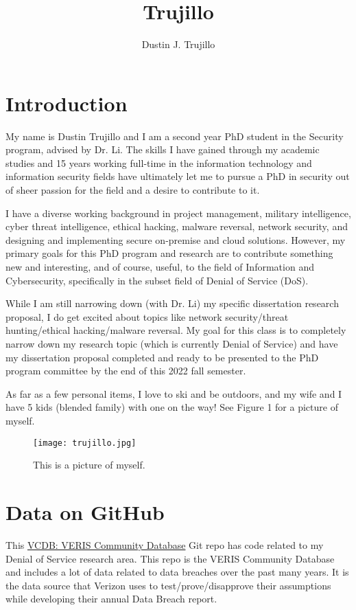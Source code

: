 \documentclass[a4paper]{article}
\date{\displaydate{date}}
\title{Trujillo}
\author{Dustin J. Trujillo}
\begin{document}
\maketitle


\section{Introduction}

My name is Dustin Trujillo and I am a second year PhD student in the Security program, advised by Dr. Li. The skills I have gained through my academic studies and 15 years working full-time in the information technology and information security fields have ultimately let me to pursue a PhD in security out of sheer passion for the field and a desire to contribute to it.

I have a diverse working background in project management, military intelligence, cyber threat intelligence, ethical hacking, malware reversal, network security, and designing and implementing secure on-premise and cloud solutions. However, my primary goals for this PhD program and research are to contribute something new and interesting, and of course, useful, to the field of Information and Cybersecurity, specifically in the subset field of Denial of Service (DoS).

While I am still narrowing down (with Dr. Li) my specific dissertation research proposal, I do get excited about topics like network security/threat hunting/ethical hacking/malware reversal. My goal for this class is to completely narrow down my research topic (which is currently Denial of Service) and have my dissertation proposal completed and ready to be presented to the PhD program committee by the end of this 2022 fall semester.

As far as a few personal items, I love to ski and be outdoors, and my wife and I have 5 kids (blended family) with one on the way! See Figure 1 for a picture of myself.

\begin{figure}[H]
\centering
\texttt{[image: trujillo.jpg]}
\caption{\label{fig:Me}This is a picture of myself.}
\end{figure}


\section{Data on GitHub}
This \href{https://github.com/vz-risk/VCDB}{VCDB: VERIS Community Database} Git repo has code related to my Denial of Service research area. This repo is the VERIS Community Database and includes a lot of data related to data breaches over the past many years. It is the data source that Verizon uses to test/prove/disapprove their assumptions while developing their annual Data Breach report.
\end{document}

